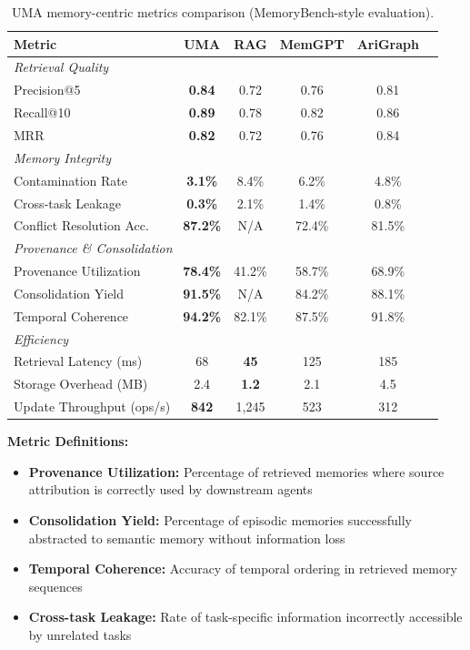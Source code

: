 \documentclass{article}
\theoremstyle{plain}
\theoremstyle{definition}
\theoremstyle{remark}
\begin{document}
\begin{table}[h]
\centering
\caption{UMA memory-centric metrics comparison (MemoryBench-style evaluation).}
\label{tab:uma-memorybench}
\small
\begin{tabular}{lccccc}
\toprule
\textbf{Metric} & \textbf{UMA} & \textbf{RAG} & \textbf{MemGPT} & \textbf{AriGraph} \\
\midrule
\multicolumn{5}{l}{\textit{Retrieval Quality}} \\
Precision@5 & \textbf{0.84} & 0.72 & 0.76 & 0.81 \\
Recall@10 & \textbf{0.89} & 0.78 & 0.82 & 0.86 \\
MRR & \textbf{0.82} & 0.72 & 0.76 & 0.84 \\
\midrule
\multicolumn{5}{l}{\textit{Memory Integrity}} \\
Contamination Rate & \textbf{3.1\%} & 8.4\% & 6.2\% & 4.8\% \\
Cross-task Leakage & \textbf{0.3\%} & 2.1\% & 1.4\% & 0.8\% \\
Conflict Resolution Acc. & \textbf{87.2\%} & N/A & 72.4\% & 81.5\% \\
\midrule
\multicolumn{5}{l}{\textit{Provenance \& Consolidation}} \\
Provenance Utilization & \textbf{78.4\%} & 41.2\% & 58.7\% & 68.9\% \\
Consolidation Yield & \textbf{91.5\%} & N/A & 84.2\% & 88.1\% \\
Temporal Coherence & \textbf{94.2\%} & 82.1\% & 87.5\% & 91.8\% \\
\midrule
\multicolumn{5}{l}{\textit{Efficiency}} \\
Retrieval Latency (ms) & 68 & \textbf{45} & 125 & 185 \\
Storage Overhead (MB) & 2.4 & \textbf{1.2} & 2.1 & 4.5 \\
Update Throughput (ops/s) & \textbf{842} & 1,245 & 523 & 312 \\
\bottomrule
\end{tabular}
\end{table}

\textbf{Metric Definitions:}
\begin{itemize}[nosep,leftmargin=*]
\item \textbf{Provenance Utilization:} Percentage of retrieved memories where source attribution is correctly used by downstream agents
\item \textbf{Consolidation Yield:} Percentage of episodic memories successfully abstracted to semantic memory without information loss
\item \textbf{Temporal Coherence:} Accuracy of temporal ordering in retrieved memory sequences
\item \textbf{Cross-task Leakage:} Rate of task-specific information incorrectly accessible by unrelated tasks
\end{itemize}
\end{document}
